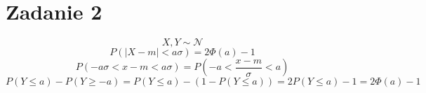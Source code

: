 \section*{Zadanie 2}
\begin{equation*}
X,Y\sim{\mathcal{N}}
\end{equation*}
\begin{equation*}
P(|X-m|<a\sigma)=2\Phi{(a)}-1
\end{equation*}
\begin{equation*}
P(-a\sigma<x-m<a\sigma)=P(-a<\frac{x-m}{\sigma}<a)
\end{equation*}
\begin{equation*}
P(Y\leq{a})-P(Y\geq{-a})=P(Y\leq{a})-(1-P(Y\leq{a}))=2P(Y\leq{a})-1=2\Phi{(a)}-1
\end{equation*}
